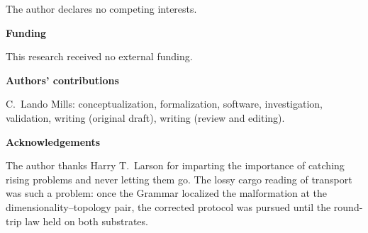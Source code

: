 \documentclass[12pt,a4paper]{article}
\begin{document}
\noindent
The author declares no competing interests.

\vspace{1em}

\noindent\textbf{Funding}

\noindent
This research received no external funding.

\vspace{1em}

\noindent\textbf{Authors' contributions}

\noindent
C.\ Lando Mills: conceptualization, formalization, software, investigation,
validation, writing (original draft), writing (review and editing).

\vspace{1em}

\noindent\textbf{Acknowledgements}

\noindent
The author thanks Harry T.\ Larson for imparting the importance of catching rising
problems and never letting them go.
The lossy cargo reading of transport was such a problem: once the Grammar localized
the malformation at the dimensionality--topology pair, the corrected protocol was
pursued until the round-trip law held on both substrates.
\end{document}
